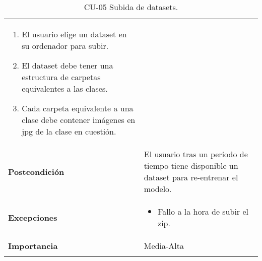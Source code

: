 \begin{longtable}[H]{@{}ll@{}}
\begin{minipage}[t]{0.68\columnwidth}
\begin{enumerate}
\def\labelenumi{\arabic{enumi}.}
\tightlist
\item
  El usuario elige un dataset en su ordenador para subir.
\item
  El dataset debe tener una estructura de carpetas equivalentes a las clases.
\item
  Cada carpeta equivalente a una clase debe contener imágenes en jpg de la clase en cuestión.
\end{enumerate}\strut
\end{minipage}\tabularnewline
\begin{minipage}[t]{0.26\columnwidth}\raggedright\strut
\textbf{Postcondición}\strut
\end{minipage} & \begin{minipage}[t]{0.68\columnwidth}\raggedright\strut%
El usuario tras un periodo de tiempo tiene disponible un dataset para re-entrenar el modelo.\strut
\end{minipage}\tabularnewline
\begin{minipage}[t]{0.26\columnwidth}\raggedright\strut
\textbf{Excepciones}\strut
\end{minipage} & \begin{minipage}[t]{0.68\columnwidth}\raggedright\strut%
\begin{itemize}
\tightlist
\item
  Fallo a la hora de subir el zip.
\end{itemize}\strut
\end{minipage}\tabularnewline
\begin{minipage}[t]{0.26\columnwidth}\raggedright\strut
\textbf{Importancia}\strut
\end{minipage} & \begin{minipage}[t]{0.68\columnwidth}\raggedright\strut%
Media-Alta\strut
\end{minipage}\tabularnewline
\bottomrule%
\caption{CU-05 Subida de datasets.}
\end{longtable}


